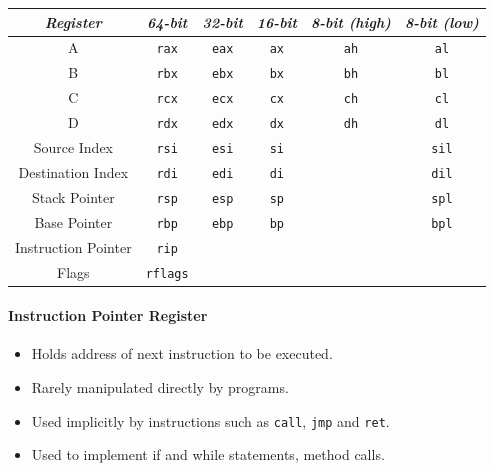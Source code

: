 \documentclass[twocolumn,english]{article}
\providecommand{\tabularnewline}{\\}
\begin{document}
\begin{table}[H]
\noindent \centering{}\texttt{\footnotesize{}}%
\begin{tabular}{cccccc}
\toprule 
\emph{\footnotesize{}Register} & \emph{\footnotesize{}64-bit} & \emph{\footnotesize{}32-bit} & \emph{\footnotesize{}16-bit} & \emph{\footnotesize{}8-bit (high)} & \emph{\footnotesize{}8-bit (low)}\tabularnewline
\midrule
{\footnotesize{}A} & \texttt{\footnotesize{}rax} & \texttt{\footnotesize{}eax} & \texttt{\footnotesize{}ax} & \texttt{\footnotesize{}ah} & \texttt{\footnotesize{}al}\tabularnewline
{\footnotesize{}B} & \texttt{\footnotesize{}rbx} & \texttt{\footnotesize{}ebx} & \texttt{\footnotesize{}bx} & \texttt{\footnotesize{}bh} & \texttt{\footnotesize{}bl}\tabularnewline
{\footnotesize{}C} & \texttt{\footnotesize{}rcx} & \texttt{\footnotesize{}ecx} & \texttt{\footnotesize{}cx} & \texttt{\footnotesize{}ch} & \texttt{\footnotesize{}cl}\tabularnewline
{\footnotesize{}D} & \texttt{\footnotesize{}rdx} & \texttt{\footnotesize{}edx} & \texttt{\footnotesize{}dx} & \texttt{\footnotesize{}dh} & \texttt{\footnotesize{}dl}\tabularnewline
{\footnotesize{}Source Index} & \texttt{\footnotesize{}rsi} & \texttt{\footnotesize{}esi} & \texttt{\footnotesize{}si} &  & \texttt{\footnotesize{}sil}\tabularnewline
{\footnotesize{}Destination Index} & \texttt{\footnotesize{}rdi} & \texttt{\footnotesize{}edi} & \texttt{\footnotesize{}di} &  & \texttt{\footnotesize{}dil}\tabularnewline
{\footnotesize{}Stack Pointer} & \texttt{\footnotesize{}rsp} & \texttt{\footnotesize{}esp} & \texttt{\footnotesize{}sp} &  & \texttt{\footnotesize{}spl}\tabularnewline
{\footnotesize{}Base Pointer} & \texttt{\footnotesize{}rbp} & \texttt{\footnotesize{}ebp} & \texttt{\footnotesize{}bp} &  & \texttt{\footnotesize{}bpl}\tabularnewline
{\footnotesize{}Instruction Pointer} & \texttt{\footnotesize{}rip} &  &  &  & \tabularnewline
{\footnotesize{}Flags} & \texttt{\footnotesize{}rflags} &  &  &  & \tabularnewline
\bottomrule
\end{tabular}
\end{table}



\paragraph{Instruction Pointer Register}
\begin{itemize}
\item Holds address of next instruction to be executed.
\item Rarely manipulated directly by programs.
\item Used implicitly by instructions such as \texttt{call}, \texttt{jmp}
and \texttt{ret}.
\item Used to implement if and while statements, method calls.
\end{itemize}
\end{document}
